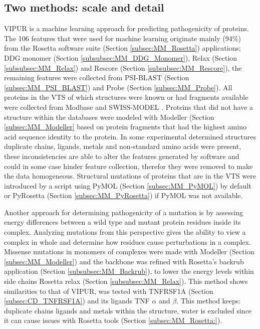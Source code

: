 \subsection{Two methods: scale and detail}

VIPUR is a machine learning approach for predicting pathogenicity of proteins. The 106 features that were used for machine learning originate mainly (94\%) from the Rosetta software suite (Section \ref{subsec:MM_Rosetta}) applications; DDG monomer (Section \ref{subsubsec:MM_DDG_Monomer}), Relax (Section \ref{subsubsec:MM_Relax}) and Rescore (Section \ref{subsubsec:MM_Rescore}), the remaining features were collected from PSI-BLAST (Section \ref{subsec:MM_PSI_BLAST}) and Probe (Section \ref{subsec:MM_Probe}). 
All proteins in the VTS of which structures were known or had fragments available were collected from Modbase \cite{} and
SWISS-MODEL \cite{}.
Proteins that did not have a structure within the databases were modeled with Modeller (Section \ref{subsec:MM_Modeller} based on protein fragments that had the highest amino acid sequence identity to the protein.
In some experimental determined structures duplicate chains, ligands, metals and non-standard amino acids were present, these inconsistencies are able to alter the features generated by software and could in some case hinder feature collection, therefor they were removed to make the data homogeneous. Structural mutations of proteins that are in the VTS were introduced by a script using PyMOL (Section \ref{subsec:MM_PyMOL}) by default or PyRosetta (Section \ref{subsec:MM_PyRosetta}) if PyMOL was not available.

Another approach for determining pathogenicity of a mutation is by assessing energy differences between a wild type and mutant protein residues inside its complex. Analyzing mutations from this perspective gives the ability to view a complex in whole and determine how residues cause perturbations in a complex. Missense mutations in monomers of complexes were made with Modeller (Section \ref{subsec:MM_Modeller}) and the backbone was refined with Rosetta's backrub application (Section \ref{subsubsec:MM_Backrub}), to lower the energy levels within side chains Rosetta relax (Section \ref{subsubsec:MM_Relax}). This method shows similarities to that of VIPUR,  was tested with TNFRSF1A (Section \ref{subsec:CD_TNFRSF1A}) and its ligands TNF $\alpha$ and $\beta$. This method keeps: duplicate chains ligands and metals within the structure, water is excluded since it can cause issues with Rosetta tools (Section \ref{subsec:MM_Rosetta:}).

